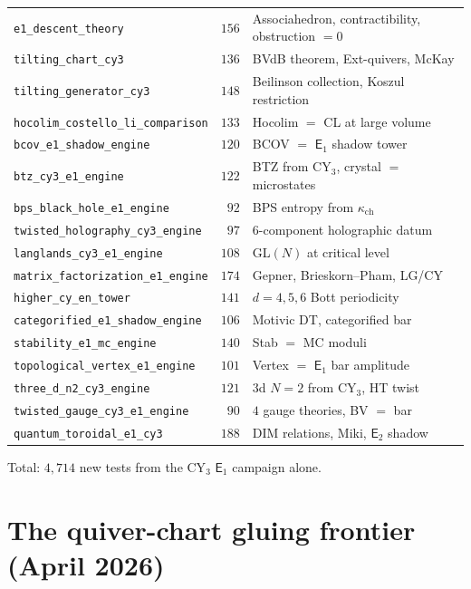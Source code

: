 \documentclass[11pt]{article}
\newcommand{\Eone}{\mathsf{E}_1}
\newcommand{\Etwo}{\mathsf{E}_2}
\begin{document}
\begin{center}
\begin{longtable}{lr@{\quad}l}
 \texttt{e1\_descent\_theory} & $156$ & Associahedron, contractibility, obstruction $= 0$ \\
 \texttt{tilting\_chart\_cy3} & $136$ & BVdB theorem, Ext-quivers, McKay \\
 \texttt{tilting\_generator\_cy3} & $148$ & Beilinson collection, Koszul restriction \\
 \texttt{hocolim\_costello\_li\_comparison} & $133$ & Hocolim $=$ CL at large volume \\
 \texttt{bcov\_e1\_shadow\_engine} & $120$ & BCOV $=$ $\Eone$ shadow tower \\
 \texttt{btz\_cy3\_e1\_engine} & $122$ & BTZ from CY$_3$, crystal $=$ microstates \\
 \texttt{bps\_black\_hole\_e1\_engine} & $92$ & BPS entropy from $\kappa_{\mathrm{ch}}$ \\
 \texttt{twisted\_holography\_cy3\_engine} & $97$ & $6$-component holographic datum \\
 \texttt{langlands\_cy3\_e1\_engine} & $108$ & GL$(N)$ at critical level \\
 \texttt{matrix\_factorization\_e1\_engine} & $174$ & Gepner, Brieskorn--Pham, LG/CY \\
 \texttt{higher\_cy\_en\_tower} & $141$ & $d = 4, 5, 6$ Bott periodicity \\
 \texttt{categorified\_e1\_shadow\_engine} & $106$ & Motivic DT, categorified bar \\
 \texttt{stability\_e1\_mc\_engine} & $140$ & Stab $=$ MC moduli \\
 \texttt{topological\_vertex\_e1\_engine} & $101$ & Vertex $=$ $\Eone$ bar amplitude \\
 \texttt{three\_d\_n2\_cy3\_engine} & $121$ & $3$d $N\!=\!2$ from CY$_3$, HT twist \\
 \texttt{twisted\_gauge\_cy3\_e1\_engine} & $90$ & $4$ gauge theories, BV $=$ bar \\
 \texttt{quantum\_toroidal\_e1\_cy3} & $188$ & DIM relations, Miki, $\Etwo$ shadow \\
 \bottomrule
\end{longtable}
\end{center}

\noindent Total: $4{,}714$ new tests from the CY$_3$ $\Eone$ campaign alone.


\section{The quiver-chart gluing frontier (April 2026)}
\label{sec:chart-gluing-frontier}
\end{document}
